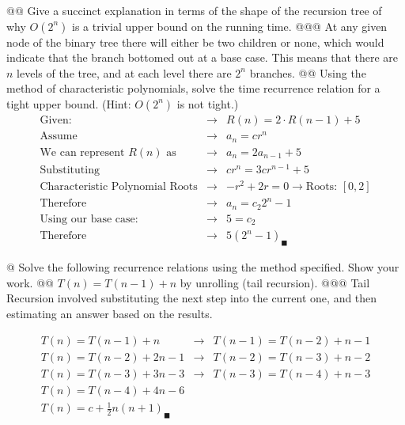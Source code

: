 \documentclass[10pt]{article}
\begin{document}
\begin{easylist}[enumerate]
    @@ Give a succinct explanation in terms of the shape of the recursion tree of why $O(2^n)$ is a trivial upper bound on the running time.
    @@@ At any given node of the binary tree there will either be two children or none, which would indicate that the branch bottomed out at a base case. This means that there are $n$ levels of the tree, and at each level there are $2^n$ branches.
    @@ Using the method of characteristic polynomials, solve the time recurrence relation for a tight upper bound. (Hint: $O(2^n)$ is not tight.)
    \[
        \begin{aligned}
            \text{Given: }                         & \to & R(n) = 2 \cdot R(n - 1) + 5\\
            \text{Assume }                         & \to & a_n = c r^n\\
            \text{We can represent $R(n)$ as }     & \to & a_n = 2 a_{n-1} + 5\\
            \text{Substituting }                   & \to & c r^n = 3cr^{n-1} + 5\\
            \text{Characteristic Polynomial Roots} & \to & -r^2 + 2r = 0 \to \text{Roots: } [0, 2]\\
            \text{Therefore}                       & \to & a_n = c_2 2^n - 1\\
            \text{Using our base case: }           & \to & 5 = c_2\\
            \text{Therefore}                       & \to & \boxed{5(2^n - 1)}_\blacksquare
        \end{aligned}
    \]

    \newpage
    @ Solve the following recurrence relations using the method specified. Show your work.
    @@ $T(n) = T (n − 1) + n$ by unrolling (tail recursion).
    @@@ Tail Recursion involved substituting the next step into the current one, and then estimating an answer based on the results.

        \[
            \begin{matrix}
                T(n) = T(n - 1) + n      & \to & T(n - 1) = T(n - 2) + n - 1\\
                T(n) = T(n - 2) + 2n - 1 & \to & T(n - 2) = T(n - 3) + n - 2\\
                T(n) = T(n - 3) + 3n - 3 & \to & T(n - 3) = T(n - 4) + n - 3\\
                T(n) = T(n - 4) + 4n - 6 & & \\
                \boxed{T(n) = c + \frac{1}{2} n ( n + 1)}_\blacksquare
            \end{matrix}
        \]


\end{easylist}
\end{document}
